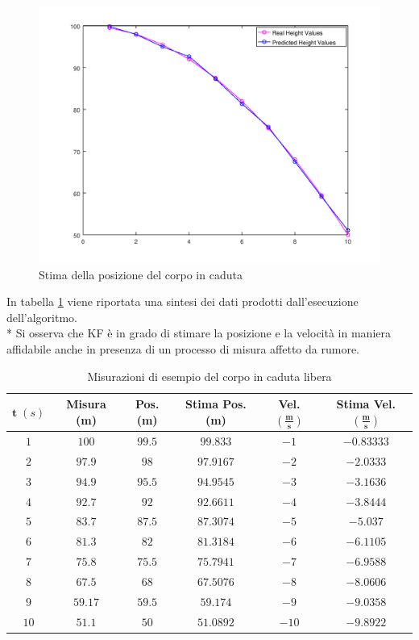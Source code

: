 \begin{figure}[h]
	\centering
	\includegraphics[scale=0.45]{img/predheight}
	\caption{Stima della posizione del corpo in caduta}
	\label{fig:predheight}
\end{figure}
\newpage
In tabella \ref{tab:syntex} viene riportata una sintesi dei dati prodotti dall'esecuzione dell'algoritmo.\\*
Si osserva che KF \`e in grado di stimare la posizione e la velocit\`a in maniera affidabile anche in presenza di un processo di misura affetto da rumore.
\begin{table}[h]
	\begin{tabular}{|c|c|c|c|c|c|}
		\hline 
		$\mathbf{t}\;(s)$ & \textbf{Misura (m)} & \textbf{Pos.(m)} & \textbf{Stima Pos. (m)} & \textbf{Vel.} $\mathbf{\left(\frac{m}{s}\right)}$ & \textbf{Stima Vel.} $\mathbf{\left(\frac{m}{s}\right)}$ \\ 
		\hline 
		$1$ & $100$ & $99.5$ & $99.833$ & $-1$ & $-0.83333$ \\ 
		\hline 
		$2$ & $97.9$ & $98$ & $97.9167$ & $-2$ & $-2.0333$ \\ 
		\hline 
		$3$ & $94.9$ & $95.5$ & $94.9545$ & $-3$ & $-3.1636$ \\ 
		\hline 
		$4$ & $92.7$ & $92$ & $92.6611$ & $-4$ & $-3.8444$ \\ 
		\hline 
		$5$ & $83.7$ & $87.5$ & $87.3074$ & $-5$ & $-5.037$ \\ 
		\hline 
		$6$ & $81.3$ & $82$ & $81.3184$ & $-6$ & $-6.1105$ \\ 
		\hline 
		$7$ & $75.8$ & $75.5$ & $75.7941$ & $-7$ & $-6.9588$ \\ 
		\hline 
		$8$ & $67.5$ & $68$ & $67.5076$ & $-8$ & $-8.0606$ \\ 
		\hline 
		$9$ & $59.17$ & $59.5$ & $59.174$ & $-9$ & $-9.0358$ \\ 
		\hline 
		$10$ & $51.1$ & $50$ & $51.0892$ & $-10$ & $-9.8922$ \\ 
		\hline 
	\end{tabular} 
	\caption{Misurazioni di esempio del corpo in caduta libera}
	\label{tab:syntex}
\end{table}

